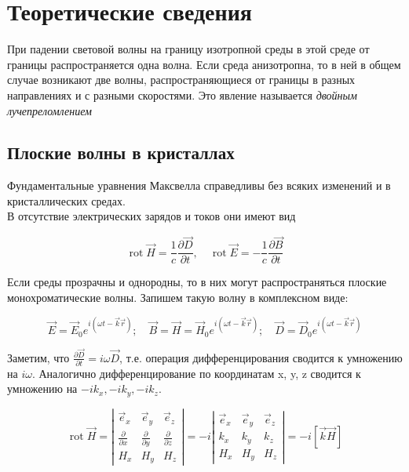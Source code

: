 \documentclass[a4paper,12pt]{article}
\begin{document}
\section*{Теоретические сведения}

При падении световой волны на границу изотропной среды в этой среде от границы распространяется одна волна. Если среда анизотропна, то в ней в общем случае возникают две волны, распространяющиеся от границы в разных направлениях и с разными скоростями. Это явление называется \textit{двойным лучепреломлением}

\subsection*{Плоские волны в кристаллах}

Фундаментальные уравнения Максвелла справедливы без всяких изменений и в кристаллических средах. \\
В отсутствие электрических зарядов и токов они имеют вид

\begin{equation}
\operatorname{rot} \vec{H} = \frac{1}{c} \frac{\partial \vec{D}}{\partial t}, \quad  \operatorname{rot} \vec{E} = -\frac{1}{c} \frac{\partial \vec B}{\partial t}
\end{equation}

Если среды прозрачны и однородны, то в них могут распространяться плоские монохроматические волны. Запишем такую волну в комплексном виде:

\[
\vec{E}=\vec{E}_{0} e^{i(\omega t-\vec{k} \vec{r})} ; \quad \vec{B}=\vec{H}=\vec{H}_{0} e^{i(\omega t-\vec{k} \vec{r})} ; \quad \vec{D}=\vec{D}_{0} e^{i(\omega t-\vec{k} \vec{r})}
\]

Заметим, что $\frac{\partial \vec{D}}{\partial t} = i \omega \vec{D}$, т.е. операция дифференцирования сводится к умножению на $i \omega$. Аналогично дифференцирование по координатам x, y, z сводится к умножению на $-ik_x, -ik_y, -ik_z$.

\[
\operatorname{rot} \vec{H}=\left|\begin{array}{ccc}
\vec{e}_{x} & \vec{e}_{y} & \vec{e}_{z} \\
\frac{\partial}{\partial x} & \frac{\partial}{\partial y} & \frac{\partial}{\partial z} \\
H_{x} & H_{y} & H_{z}
\end{array}\right|=-i\left|\begin{array}{ccc}
\vec{e}_{x} & \vec{e}_{y} & \vec{e}_{z} \\
k_{x} & k_{y} & k_{z} \\
H_{x} & H_{y} & H_{z}
\end{array}\right|=-i[\vec{k} \vec{H}]
\]
\end{document}
